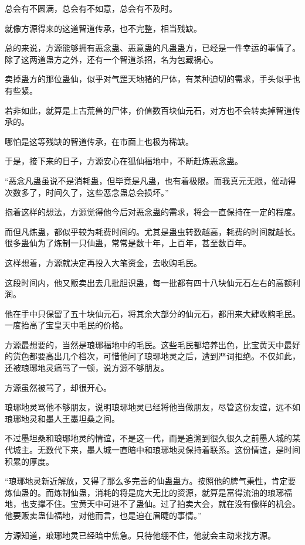 \begin{this_body}
总会有不圆满，总会有不如意，总会有不及时。

就像方源得来的这道智道传承，也不完整，相当残缺。

总的来说，方源能够拥有恶念蛊、恶意蛊的凡蛊蛊方，已经是一件幸运的事情了。除了这两道蛊方之外，还有一个智道杀招，名为包藏祸心。

卖掉蛊方的那位蛊仙，似乎对气罡天地猪的尸体，有某种迫切的需求，手头似乎也有些紧。

若非如此，就算是上古荒兽的尸体，价值数百块仙元石，对方也不会转卖掉智道传承的。

哪怕是这等残缺的智道传承，在市面上也极为稀缺。

于是，接下来的日子，方源安心在狐仙福地中，不断赶炼恶念蛊。

“恶念凡蛊虽说不是消耗蛊，但毕竟是凡蛊，也有着极限。而我真元无限，催动得次数多了，时间久了，这些恶念蛊总会损坏。”

抱着这样的想法，方源觉得他今后对恶念蛊的需求，将会一直保持在一定的程度。

而但凡炼蛊，都似乎较为耗费时间的。尤其是蛊虫转数越高，耗费的时间就越长。很多蛊仙为了炼制一只仙蛊，常常是数十年，上百年，甚至数百年。

这样想着，方源就决定再投入大笔资金，去收购毛民。

这段时间内，他又贩卖出去几批胆识蛊，每一批都有四十八块仙元石左右的高额利润。

他在手中只保留了五十块仙元石，将其余大部分的仙元石，都用来大肆收购毛民。一度抬高了宝皇天中毛民的价格。

方源最想要的，当然是琅琊福地中的毛民。这些毛民都培养出色，比宝黄天中最好的货色都要高出几个档次，可惜他问了琅琊地灵之后，遭到严词拒绝。不仅如此，还被琅琊地灵痛骂了一顿，说方源不够朋友。

方源虽然被骂了，却很开心。

琅琊地灵骂他不够朋友，说明琅琊地灵已经将他当做朋友，尽管这份友谊，远不如琅琊地灵和墨人王墨坦桑之间。

不过墨坦桑和琅琊地灵的情谊，不是这一代，而是追溯到很久很久之前墨人城的某代城主。无数代下来，墨人城一直暗中和琅琊地灵保持着联系。这份情谊，是时间积累的厚度。

“琅琊地灵新近解放，又得了那么多完善的仙蛊蛊方。按照他的脾气秉性，肯定要炼仙蛊的。而炼制仙蛊，消耗的将是庞大无比的资源，就算是富得流油的琅琊福地，也支撑不住。宝黄天中可进不了蛊仙。过了拍卖大会，就在没有像样的机会。他要贩卖蛊仙福地，对他而言，也是迫在眉睫的事情。”

方源知道，琅琊地灵已经暗中焦急。只待他绷不住，他就会主动来找方源。


\end{this_body}
